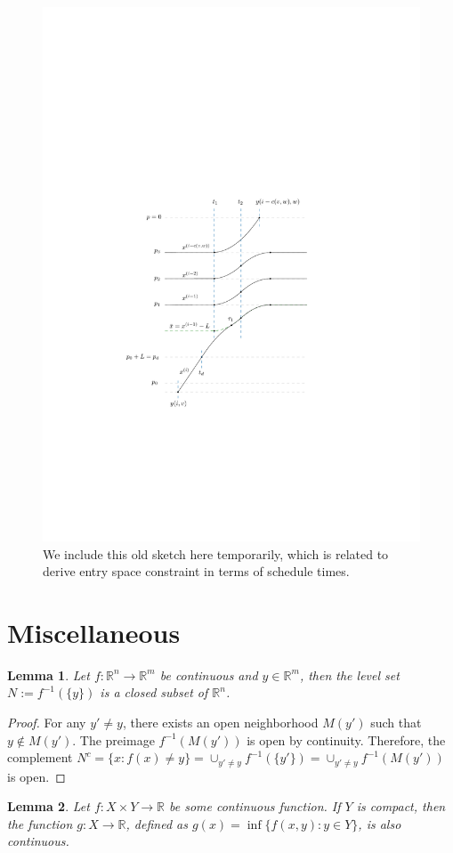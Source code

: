 \documentclass[a4paper]{article}
\theoremstyle{definition}
\theoremstyle{plain}
\newtheorem{lemma}{Lemma\hspace{0.25em}\ignorespaces}
\begin{document}
\begin{figure}
  \centering
  \includegraphics[scale=1]{figures/motion/example1}
  \caption{{\color{Navy} We include this old sketch here temporarily, which is
      related to derive entry space constraint in terms of schedule times.}}%
\end{figure}


\newpage
\appendix
\section{Miscellaneous}

\begin{lemma}\label{lemma:levelset}
  Let $f :\mathbb{R}^{n} \rightarrow \mathbb{R}^{m}$ be continuous and
  $y \in \mathbb{R}^{m}$, then the level set $N := f^{-1}(\{ y \})$ is a closed
  subset of $\mathbb{R}^{n}$.
\end{lemma}
\begin{proof}
  For any $y' \neq y$, there exists an open neighborhood $M(y')$ such that
  $y \notin M(y')$. The preimage $f^{-1}(M(y'))$ is open by continuity.
  Therefore, the complement
  $N^{c} = \{ x : f(x) \neq y \} = \cup_{y' \neq y} f^{-1}(\{y'\}) = \cup_{y' \neq y} f^{-1}(M(y'))$
  is open.
\end{proof}

\begin{lemma}\label{lemma:inf-continuous}
  Let $f : X \times Y \rightarrow \mathbb{R}$ be some continuous function. If
  $Y$ is compact, then the function $g : X \rightarrow \mathbb{R}$, defined as
  $g(x) = \inf \{ f(x,y) : y\in Y\}$, is also continuous.
\end{lemma}
\end{document}
